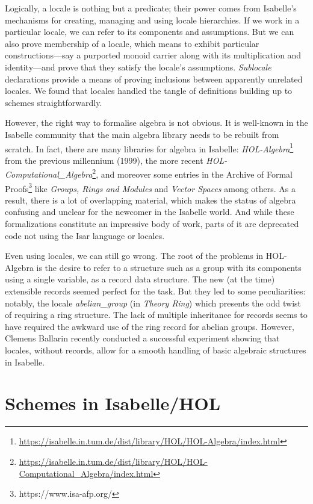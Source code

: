 \documentclass[12pt]{scrartcl}
\begin{document}
Logically, a locale is nothing but a predicate; their power comes from Isabelle's mechanisms for creating, managing and using locale hierarchies.
If we work in a particular locale, we can refer to its components and assumptions. But we can also prove membership of a locale, which means to exhibit particular constructions---say a purported monoid carrier along with its multiplication and identity---and prove that they satisfy the locale's assumptions. \emph{Sublocale} declarations provide a means of proving inclusions between apparently unrelated locales.
We found that locales handled the tangle of definitions building up to schemes straightforwardly.

However, the right way to formalise algebra is not obvious.
It is well-known in the Isabelle community that the main algebra library needs to be rebuilt from scratch. In fact, there are many libraries for algebra in Isabelle: \textit{HOL-Algebra}\footnote{\url{https://isabelle.in.tum.de/dist/library/HOL/HOL-Algebra/index.html}} from the previous millennium (1999), the more recent \textit{HOL-Computational\_Algebra}\footnote{\url{https://isabelle.in.tum.de/dist/library/HOL/HOL-Computational_Algebra/index.html}}, and moreover some entries in the Archive of Formal Proofs\footnote{https://www.isa-afp.org/} like \textit{Groups, Rings and Modules} \cite{Group-Ring-Module-AFP} and \textit{Vector Spaces} \cite{VectorSpace-AFP} among others. As a result, there is a lot of overlapping material, which makes the status of algebra confusing and unclear for the newcomer in the Isabelle world. And while these formalizations constitute an impressive body of work, parts of it are deprecated code not using the Isar language or locales. 

Even using locales, we can still go wrong. The root of the problems in HOL-Algebra is the desire to refer to a structure such as a group with its components using a single variable, as a record data structure. The new (at the time) extensible records seemed perfect for the task.
But they led to some peculiarities: notably, the locale \emph{abelian\_group} (in \textit{Theory Ring}) which presents the odd twist of requiring a ring structure. The lack of multiple inheritance for records seems to have required the awkward use of the ring record for abelian groups. However, Clemens Ballarin recently conducted a successful experiment \cite{ballarin-exploring} showing that  locales, without records, allow for a smooth handling of basic algebraic structures in Isabelle. 


\section{Schemes in Isabelle/HOL}
\label{sec:schemes}
\end{document}
